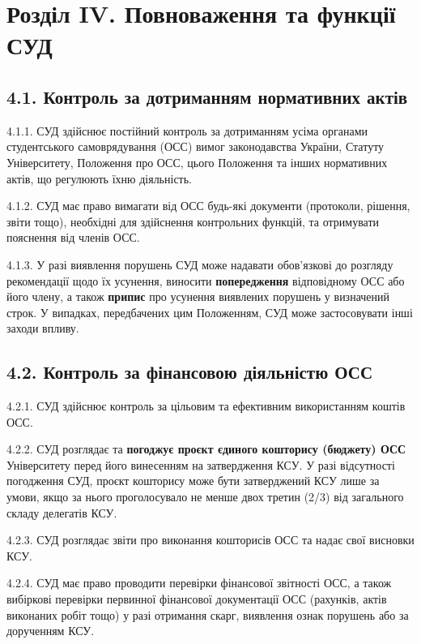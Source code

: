 \section*{Розділ IV. Повноваження та функції СУД}

\subsection*{4.1. Контроль за дотриманням нормативних актів}
    4.1.1. СУД здійснює постійний контроль за дотриманням усіма органами студентського самоврядування (ОСС) вимог законодавства України, Статуту Університету, Положення про ОСС, цього Положення та інших нормативних актів, що регулюють їхню діяльність.

    4.1.2. СУД має право вимагати від ОСС будь-які документи (протоколи, рішення, звіти тощо), необхідні для здійснення контрольних функцій, та отримувати пояснення від членів ОСС.

    4.1.3. У разі виявлення порушень СУД може надавати обов'язкові до розгляду рекомендації щодо їх усунення, виносити \textbf{попередження} відповідному ОСС або його члену, а також \textbf{припис} про усунення виявлених порушень у визначений строк. У випадках, передбачених цим Положенням, СУД може застосовувати інші заходи впливу.

\subsection*{4.2. Контроль за фінансовою діяльністю ОСС}
    4.2.1. СУД здійснює контроль за цільовим та ефективним використанням коштів ОСС.

    4.2.2. СУД розглядає та \textbf{погоджує проєкт єдиного кошторису (бюджету) ОСС} Університету перед його винесенням на затвердження КСУ. У разі відсутності погодження СУД, проєкт кошторису може бути затверджений КСУ лише за умови, якщо за нього проголосувало не менше двох третин (2/3) від загального складу делегатів КСУ.

    4.2.3. СУД розглядає звіти про виконання кошторисів ОСС та надає свої висновки КСУ.

    4.2.4. СУД має право проводити перевірки фінансової звітності ОСС, а також вибіркові перевірки первинної фінансової документації ОСС (рахунків, актів виконаних робіт тощо) у разі отримання скарг, виявлення ознак порушень або за дорученням КСУ.

